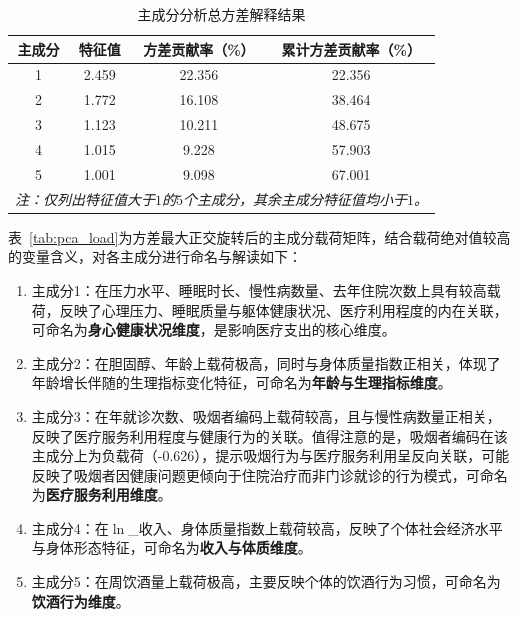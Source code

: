 \documentclass[a4paper]{ctexart}
\begin{document}
\begin{table}[H]
\centering
\caption{主成分分析总方差解释结果}
\label{tab:pca_eigen}
\begin{tabular}{cccc}
\toprule
主成分 & 特征值 & 方差贡献率（\%） & 累计方差贡献率（\%） \\
\midrule
1 & 2.459 & 22.356 & 22.356 \\
2 & 1.772 & 16.108 & 38.464 \\
3 & 1.123 & 10.211 & 48.675 \\
4 & 1.015 & 9.228 & 57.903 \\
5 & 1.001 & 9.098 & 67.001 \\
\bottomrule
\multicolumn{4}{l}{\textit{注：仅列出特征值大于$1$的$5$个主成分，其余主成分特征值均小于$1$。}}
\end{tabular}
\end{table}

表~\ref{tab:pca_load}为方差最大正交旋转后的主成分载荷矩阵，结合载荷绝对值较高的变量含义，对各主成分进行命名与解读如下：
\begin{enumerate}[(1)]
\item 主成分1：在压力水平、睡眠时长、慢性病数量、去年住院次数上具有较高载荷，反映了心理压力、睡眠质量与躯体健康状况、医疗利用程度的内在关联，可命名为\textbf{身心健康状况维度}，是影响医疗支出的核心维度。
\item 主成分2：在胆固醇、年龄上载荷极高，同时与身体质量指数正相关，体现了年龄增长伴随的生理指标变化特征，可命名为\textbf{年龄与生理指标维度}。
\item 主成分3：在年就诊次数、吸烟者编码上载荷较高，且与慢性病数量正相关，反映了医疗服务利用程度与健康行为的关联。值得注意的是，吸烟者编码在该主成分上为负载荷（-0.626），提示吸烟行为与医疗服务利用呈反向关联，可能反映了吸烟者因健康问题更倾向于住院治疗而非门诊就诊的行为模式，可命名为\textbf{医疗服务利用维度}。
\item 主成分4：在\(\ln\)\_收入、身体质量指数上载荷较高，反映了个体社会经济水平与身体形态特征，可命名为\textbf{收入与体质维度}。
\item 主成分5：在周饮酒量上载荷极高，主要反映个体的饮酒行为习惯，可命名为\textbf{饮酒行为维度}。
\end{enumerate}
\end{document}
